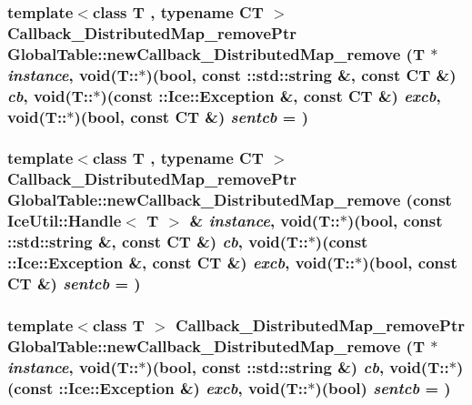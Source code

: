 \label{namespace_global_table_a22b3fb5dbf946b04af1956dd48b1cb4c}
\hypertarget{namespace_global_table_aaabc65b726d773b117dc0981cdc68b39}{
\subsubsection[{newCallback\_\-DistributedMap\_\-remove}]{\setlength{\rightskip}{0pt plus 5cm}template$<$class T , typename CT $>$ {\bf Callback\_\-DistributedMap\_\-removePtr} GlobalTable::newCallback\_\-DistributedMap\_\-remove (T $\ast$ {\em instance}, \/  void(T::$\ast$)(bool, const ::std::string \&, const CT \&) {\em cb}, \/  void(T::$\ast$)(const ::Ice::Exception \&, const CT \&) {\em excb}, \/  void(T::$\ast$)(bool, const CT \&) {\em sentcb} = {})}}
\label{namespace_global_table_aaabc65b726d773b117dc0981cdc68b39}
\hypertarget{namespace_global_table_a604e68e3859a1b769d2998057fbe7922}{
\subsubsection[{newCallback\_\-DistributedMap\_\-remove}]{\setlength{\rightskip}{0pt plus 5cm}template$<$class T , typename CT $>$ {\bf Callback\_\-DistributedMap\_\-removePtr} GlobalTable::newCallback\_\-DistributedMap\_\-remove (const IceUtil::Handle$<$ T $>$ \& {\em instance}, \/  void(T::$\ast$)(bool, const ::std::string \&, const CT \&) {\em cb}, \/  void(T::$\ast$)(const ::Ice::Exception \&, const CT \&) {\em excb}, \/  void(T::$\ast$)(bool, const CT \&) {\em sentcb} = {})}}
\label{namespace_global_table_a604e68e3859a1b769d2998057fbe7922}
\hypertarget{namespace_global_table_a9cada3fa6913d09443209b780d105769}{
\subsubsection[{newCallback\_\-DistributedMap\_\-remove}]{\setlength{\rightskip}{0pt plus 5cm}template$<$class T $>$ {\bf Callback\_\-DistributedMap\_\-removePtr} GlobalTable::newCallback\_\-DistributedMap\_\-remove (T $\ast$ {\em instance}, \/  void(T::$\ast$)(bool, const ::std::string \&) {\em cb}, \/  void(T::$\ast$)(const ::Ice::Exception \&) {\em excb}, \/  void(T::$\ast$)(bool) {\em sentcb} = {})}}
